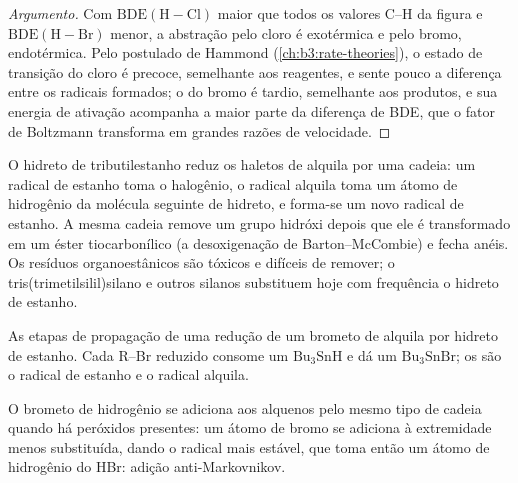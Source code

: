 \begin{proof}[Argumento]
Com $\mathrm{BDE(H{-}Cl)}$ maior que todos os valores C--H da figura e $\mathrm{BDE(H{-}Br)}$ menor,
a abstração pelo cloro é exotérmica e pelo bromo, endotérmica. Pelo postulado
de Hammond (\cref{ch:b3:rate-theories}), o estado de transição do cloro é precoce,
semelhante aos reagentes, e sente pouco a diferença entre os radicais formados;
o do bromo é tardio, semelhante aos produtos, e sua energia de ativação acompanha a maior parte
da diferença de BDE, que o fator de Boltzmann transforma em grandes razões de velocidade.
\end{proof}

O hidreto de tributilestanho reduz os haletos de alquila por uma cadeia: um radical de estanho toma o
halogênio, o radical alquila toma um átomo de hidrogênio da molécula seguinte de
hidreto, e forma-se um novo radical de estanho. A mesma cadeia remove um grupo hidróxi
depois que ele é transformado em um éster tiocarbonílico (a desoxigenação de
Barton--McCombie) e fecha anéis. Os resíduos organoestânicos são tóxicos e difíceis de
remover; o tris(trimetilsilil)silano e outros silanos substituem hoje com frequência o hidreto
de estanho.

\begin{omfigure}

{\small As etapas de propagação de uma redução de um brometo de alquila por hidreto de estanho.
Cada R--Br reduzido consome um $\mathrm{Bu_3SnH}$ e dá um $\mathrm{Bu_3SnBr}$; os 
são o radical de estanho e o radical alquila.}
\end{omfigure}

O brometo de hidrogênio se adiciona aos alquenos pelo mesmo tipo de cadeia quando há
peróxidos presentes: um átomo de bromo se adiciona à extremidade menos substituída, dando o radical
mais estável, que toma então um átomo de hidrogênio do HBr: adição
anti-Markovnikov.

